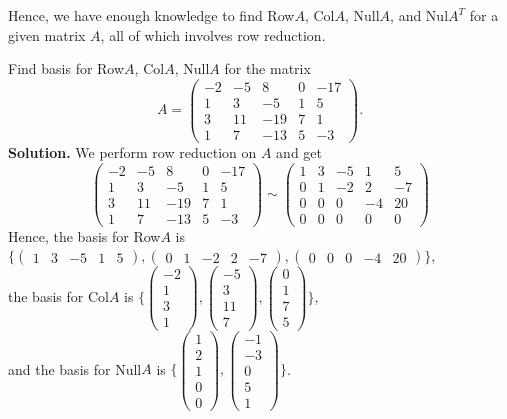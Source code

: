 \documentclass[10pt, a4paper]{article}
\begin{document}
\indent Hence, we have enough knowledge to find Row$A$, Col$A$, Null$A$, and Nul$A^T$ for a given matrix $A$, all of which involves row reduction. 
\begin{example}
    Find basis for Row$A$, Col$A$, Null$A$ for the matrix \[
    A = \begin{pmatrix}
        -2&-5&8&0&-17\\
        1&3&-5&1&5\\
        3&11&-19&7&1\\
        1&7&-13&5&-3
    \end{pmatrix}.
    \]
    \textbf{Solution.} We perform row reduction on $A$ and get \[
    \begin{pmatrix}
        -2&-5&8&0&-17\\
        1&3&-5&1&5\\
        3&11&-19&7&1\\
        1&7&-13&5&-3
    \end{pmatrix}\sim \begin{pmatrix}
        1&3&-5&1&5\\
        0&1&-2&2&-7\\
        0&0&0&-4&20\\
        0&0&0&0&0
    \end{pmatrix}
    \]
    Hence, the basis for Row$A$ is $\{\begin{pmatrix}
        1&3&-5&1&5
    \end{pmatrix}, \begin{pmatrix}
        0&1&-2&2&-7
    \end{pmatrix}, \begin{pmatrix}
        0 & 0 & 0 & -4 & 20
    \end{pmatrix}
    \}$,\\ the basis for Col$A$ is $\{\begin{pmatrix}
        -2\\1\\3\\1
    \end{pmatrix}, \begin{pmatrix}
        -5\\3\\11\\7
    \end{pmatrix}, \begin{pmatrix}
        0\\1\\7\\5
    \end{pmatrix}\}$,\\
    and the basis for Null$A$ is $\{\begin{pmatrix}
        1\\2\\1\\0\\0
    \end{pmatrix}, \begin{pmatrix}
        -1\\-3\\0\\5\\1
    \end{pmatrix}\}$.
\end{example}
\end{document}
